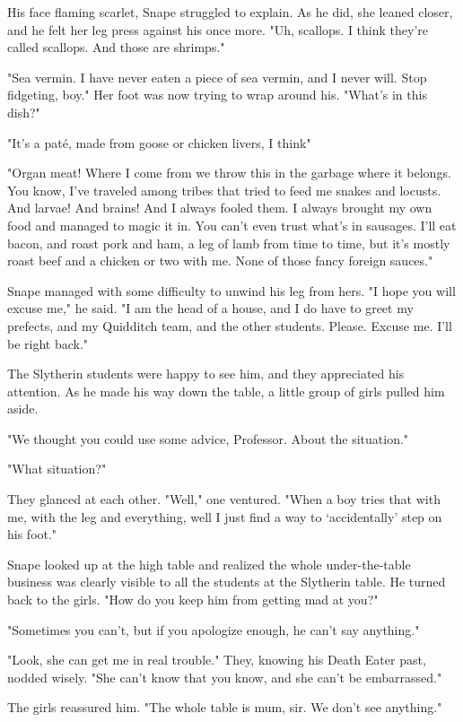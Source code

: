 His face flaming scarlet, Snape struggled to explain. As he did, she leaned closer, and he felt her leg press against his once more. "Uh, scallops. I think they're called scallops. And those are shrimps."

"Sea vermin. I have never eaten a piece of sea vermin, and I never will. Stop fidgeting, boy." Her foot was now trying to wrap around his. "What's in this dish?"

"It's a paté, made from goose or chicken livers, I think{\el}"

"Organ meat! Where I come from we throw this in the garbage where it belongs. You know, I've traveled among tribes that tried to feed me snakes and locusts. And larvae! And brains! And I always fooled them. I always brought my own food and managed to magic it in. You can't even trust what's in sausages. I'll eat bacon, and roast pork and ham, a leg of lamb from time to time, but it's mostly roast beef and a chicken or two with me. None of those fancy foreign sauces."

Snape managed with some difficulty to unwind his leg from hers. "I hope you will excuse me," he said. "I am the head of a house, and I do have to greet my prefects, and my Quidditch team, and the other students. Please. Excuse me. I'll be right back."

The Slytherin students were happy to see him, and they appreciated his attention. As he made his way down the table, a little group of girls pulled him aside.

"We thought you could use some advice, Professor. About the situation."

"What situation?"

They glanced at each other. "Well," one ventured. "When a boy tries that with me, with the leg and everything, well I just find a way to `accidentally' step on his foot."

Snape looked up at the high table and realized the whole under-the-table business was clearly visible to all the students at the Slytherin table. He turned back to the girls. "How do you keep him from getting mad at you?"

"Sometimes you can't, but if you apologize enough, he can't say anything."

"Look, she can get me in real trouble." They, knowing his Death Eater past, nodded wisely. "She can't know that you know, and she can't be embarrassed."

The girls reassured him. "The whole table is mum, sir. We don't see anything."

